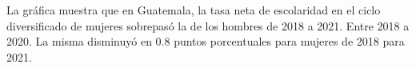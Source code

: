 La gráfica muestra que en Guatemala, la tasa neta de escolaridad en el ciclo diversificado de mujeres sobrepasó la de los hombres de 2018 a 2021. Entre 2018 a 2020. La misma disminuyó en 0.8 puntos porcentuales para mujeres de 2018 para 2021.